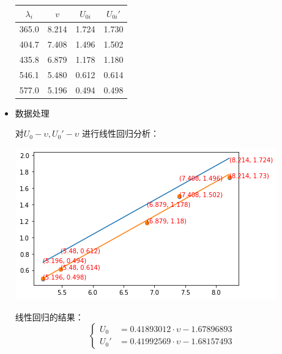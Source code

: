 \documentclass[a4paper]{ltxdoc}
\newenvironment{Figure}
  {\par\medskip\noindent\minipage{\linewidth}}
  {\endminipage\par\medskip}
\begin{document}
\begin{multicols}{2}
\begin{itemize}
\begin{Figure}
                  \smallskip
                  \begin{tabular}{|c|c|c|c|}
                      \hline $\lambda _i$ & $v$   & $U_{0i}$ & $U_{0i} \prime$ \\
                      \hline 365.0        & 8.214 & 1.724    & 1.730           \\
                      \hline 404.7        & 7.408 & 1.496    & 1.502           \\
                      \hline 435.8        & 6.879 & 1.178    & 1.180           \\
                      \hline 546.1        & 5.480 & 0.612    & 0.614           \\
                      \hline 577.0        & 5.196 & 0.494    & 0.498           \\ \hline
                  \end{tabular}
              \end{Figure}

        \item 数据处理

              对$U_0 - \upsilon,U_0\prime - \upsilon$ 进行线性回归分析：

              \begin{Figure}
                  \centering
                  \includegraphics[width=\linewidth]{img/5.png}
              \end{Figure}

              线性回归的结果：
              $$
                  \left\{
                  \begin{aligned}
                      U_0       & = 0.41893012 \cdot \upsilon - 1.67896893  \\
                      U_0\prime & =  0.41992569 \cdot \upsilon - 1.68157493
                  \end{aligned}
                  \right.
              $$


\end{itemize}
\end{multicols}
\end{document}
